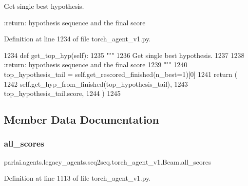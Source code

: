 \begin{DoxyVerb}Get single best hypothesis.

:return: hypothesis sequence and the final score
\end{DoxyVerb}
 

Definition at line 1234 of file torch\+\_\+agent\+\_\+v1.\+py.


\begin{DoxyCode}
1234     \textcolor{keyword}{def }get\_top\_hyp(self):
1235         \textcolor{stringliteral}{"""}
1236 \textcolor{stringliteral}{        Get single best hypothesis.}
1237 \textcolor{stringliteral}{}
1238 \textcolor{stringliteral}{        :return: hypothesis sequence and the final score}
1239 \textcolor{stringliteral}{        """}
1240         top\_hypothesis\_tail = self.get\_rescored\_finished(n\_best=1)[0]
1241         \textcolor{keywordflow}{return} (
1242             self.get\_hyp\_from\_finished(top\_hypothesis\_tail),
1243             top\_hypothesis\_tail.score,
1244         )
1245 
\end{DoxyCode}


\subsection{Member Data Documentation}
\mbox{\label{classparlai_1_1agents_1_1legacy__agents_1_1seq2seq_1_1torch__agent__v1_1_1Beam_a2be10cea5a3cbf664ec9a9a9d283e7a9}} 
\subsubsection{\texorpdfstring{all\+\_\+scores}{all\_scores}}
{\footnotesize\ttfamily parlai.\+agents.\+legacy\+\_\+agents.\+seq2seq.\+torch\+\_\+agent\+\_\+v1.\+Beam.\+all\+\_\+scores}



Definition at line 1113 of file torch\+\_\+agent\+\_\+v1.\+py.

\mbox{\label{classparlai_1_1agents_1_1legacy__agents_1_1seq2seq_1_1torch__agent__v1_1_1Beam_a3e3407eeb8dd25ede9950524146f9403}} 
